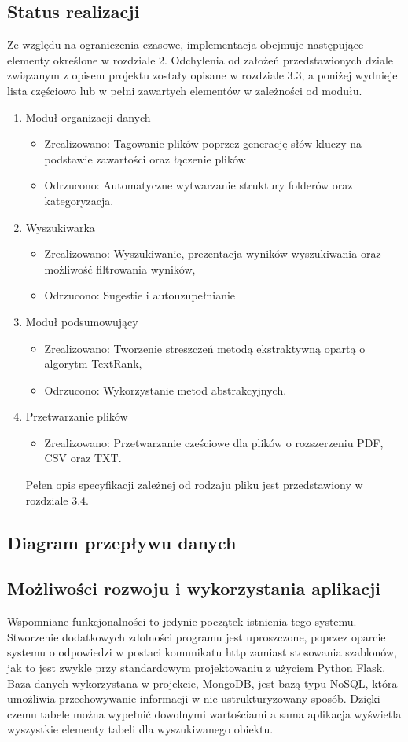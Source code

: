 \documentclass[12pt,a4paper,twoside]{article}
\begin{document}
\subsection{Status realizacji}
Ze względu na ograniczenia czasowe, implementacja obejmuje następujące elementy określone w rozdziale 2. Odchylenia od założeń przedstawionych dziale związanym z opisem projektu zostały opisane w rozdziale 3.3, a poniżej wydnieje lista częściowo lub w pełni zawartych elementów w zależności od modułu. 
\begin{enumerate}
	\item Moduł organizacji danych
	\begin{itemize}
		\item Zrealizowano: Tagowanie plików poprzez generację słów kluczy na podstawie zawartości oraz łączenie plików
		\item Odrzucono: Automatyczne wytwarzanie struktury folderów oraz kategoryzacja.
	\end{itemize}
	\item Wyszukiwarka
	\begin{itemize}
		\item Zrealizowano: Wyszukiwanie, prezentacja wyników wyszukiwania oraz możliwość filtrowania wyników,
		\item Odrzucono: Sugestie i autouzupełnianie
	\end{itemize}
	\item Moduł podsumowujący
	\begin{itemize}
		\item Zrealizowano: Tworzenie streszczeń metodą ekstraktywną opartą o algorytm TextRank,
		\item Odrzucono: Wykorzystanie metod abstrakcyjnych.
	\end{itemize}
	\item Przetwarzanie plików
	\begin{itemize}
		\item Zrealizowano: Przetwarzanie cześciowe dla plików o rozszerzeniu PDF, CSV oraz TXT.
	\end{itemize}
	Pełen opis specyfikacji zależnej od rodzaju pliku jest przedstawiony w rozdziale 3.4.
\end{enumerate}
\subsection{Diagram przepływu danych}
\subsection{Możliwości rozwoju i wykorzystania aplikacji}
Wspomniane funkcjonalności to jedynie początek istnienia tego systemu. Stworzenie dodatkowych zdolności programu jest uproszczone, poprzez oparcie systemu o odpowiedzi w postaci komunikatu http zamiast stosowania szablonów, jak to jest zwykle przy standardowym projektowaniu z użyciem Python Flask. Baza danych wykorzystana w projekcie, MongoDB, jest bazą typu NoSQL, która umożliwia przechowywanie informacji w nie ustrukturyzowany sposób. Dzięki czemu tabele można wypełnić dowolnymi wartościami a sama aplikacja wyświetla wyszystkie elementy tabeli dla wyszukiwanego obiektu.\par
\end{document}
